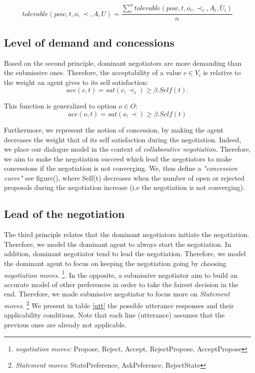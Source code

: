 \documentclass{llncs}
\begin{document}
	\begin{equation}
	tolerable(pow, t, o, \prec, A, U) = \frac{ \sum_{i}^{n} tolerable(pow, t, o_i, \prec_i, A_i, U_i) } {n}
	\end{equation}
	
	\subsection{Level of demand and concessions}
		Based on the second principle, dominant negotiators are more demanding than the submissive ones. Therefore, the acceptability of a value $c \in V_i$  is relative to the weight an agent gives to its self satisfaction:
				\begin{equation}
				acc(c, t) = sat(c, \prec_i) \geq  \beta . Self(t).
				\end{equation}
				
				This function is generalized to option $o \in O$:
				\begin{equation}
				acc(o, t) = sat(o, \prec) \geq  \beta . Self(t)
				\end{equation}
	
		
		Furthermore, we represent the notion of concession, by making the agent decreases the weight that of its self satisfaction during the negotiation. Indeed, we place our dialogue model in the context of \textit{collaborative negotiation}. Therefore, we aim to make the negotiation succeed which lead the negotiators to make concessions if the negotiation is not converging. We, thus define a \emph{"concession curve"} see figure(), where Self(t) decreases when the number of open or rejected proposals during the negotiation increase (i.e the negotiation is not converging).
		

			

	\subsection{Lead of the negotiation}
		The third principle relates that the dominant negotiators initiate the negotiation. Therefore, we model the dominant agent to always start the negotiation. In addition, dominant negotiator tend to lead the negotiation. Therefore, we model the dominant agent to focus on keeping the negotiation going by choosing \emph{negotiation moves}.  \footnote{\emph{negotiation moves:} Propose, Reject, Accept, RejectPropose, AcceptPropose}.
		In the opposite, a submissive negotiator aim to build an accurate model of other preferences in order to take the fairest decision in the end. Therefore, we made submissive negotiator to focus more on \emph{Statement moves}. \footnote{\emph{Statement moves}: StatePreference, AskPeference, RejectState}
		We present in table \ref{utt} the possible utterance responses and their applicability conditions. Note that each line (utterance) assumes that the previous ones are already not applicable.
	
\end{document}
